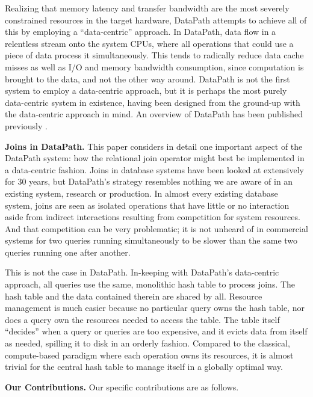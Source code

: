 \documentclass{sig-alternate}
\renewcommand\:{\colon} %
\begin{document}
Realizing that memory latency
and transfer bandwidth are the most severely constrained
resources in the target hardware,
DataPath attempts to achieve all of this by employing a ``data-centric'' approach.  
In DataPath, 
data flow in a relentless stream onto the system CPUs, where all operations that could use a piece 
of data process it simultaneously.  This tends to radically reduce data cache misses as well as I/O 
and memory bandwidth consumption, since computation is brought to the data, and not the other way around. 
DataPath is not the first system to employ a data-centric approach, but it is perhaps the most purely
data-centric system in existence, having been designed from the ground-up with the data-centric approach in mind.
An overview of DataPath has been published previously \cite{}.

\vspace{5 pt}
\noindent
\textbf{Joins in DataPath.}
This paper considers in detail one important aspect of the DataPath system: how the relational join 
operator might best
be implemented in a data-centric fashion.  Joins in database systems have been looked at extensively for 30 years, 
but DataPath's strategy resembles nothing we are aware of in an existing system, research or production.  
In almost every existing database system, joins are seen as isolated operations that have little or 
no interaction aside from indirect 
interactions resulting from competition for system resources.  And that competition can be very problematic;
it is not unheard of in commercial systems
for two queries running simultaneously to be slower than the same two queries running one after another.

This is not the case in DataPath. In-keeping with 
DataPath's data-centric approach, all queries use the same, monolithic hash table to process joins.  The hash table
and the data contained therein are shared by all.  Resource management is much easier because no particular query
owns the hash table, nor does a query own the resources needed to access the table.  The table itself ``decides'' when 
a query or queries are too expensive, and it evicts data from itself as needed, spilling it to disk in an orderly fashion.
Compared to the classical, compute-based paradigm where each operation owns its resources, it is almost trivial
for the central hash table to manage itself in a globally optimal way.

\vspace{5 pt}
\noindent
\textbf{Our Contributions.}
Our specific contributions are as follows.
\end{document}

